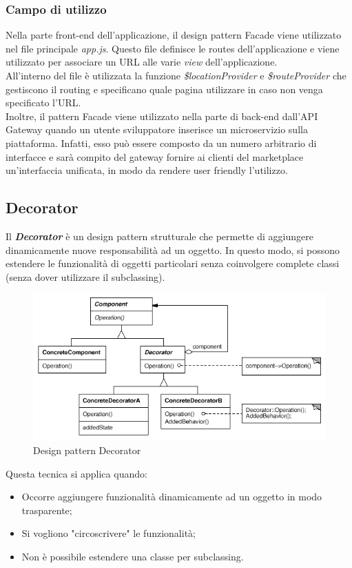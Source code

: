 \subsubsection{Campo di utilizzo}
Nella parte front-end dell'applicazione, il design pattern Facade viene utilizzato nel file principale \textit{app.js}. Questo file definisce le routes dell'applicazione e viene utilizzato per associare
un URL alle varie \textit{view} dell'applicazione.\\
All'interno del file è utilizzata la funzione  \textit{\$locationProvider} e \textit{\$routeProvider} che gestiscono il routing e specificano quale pagina utilizzare in caso non venga specificato l'URL.\\
Inoltre, il pattern Facade viene utilizzato nella parte di back-end dall'API Gateway quando un utente sviluppatore inserisce un microservizio sulla piattaforma. Infatti, esso può essere composto da un numero arbitrario di interfacce e sarà compito del gateway fornire ai clienti del marketplace un'interfaccia unificata, in modo da rendere user friendly l'utilizzo.


\subsection{Decorator}
Il \textbf{\textit{Decorator}} è un design pattern strutturale che permette di aggiungere dinamicamente nuove responsabilità ad un oggetto. In questo modo, si possono estendere le funzionalità di oggetti particolari senza coinvolgere
complete classi (senza dover utilizzare il subclassing).

\begin{figure}[H]
	\centering
	\includegraphics[width=0.7\linewidth]{IMG/decorator_pattern.png}
	\caption{Design pattern Decorator}
\end{figure}

Questa tecnica si applica quando:
\begin{itemize}
	\item Occorre aggiungere funzionalità dinamicamente ad un oggetto in modo	trasparente;
	
	\item Si vogliono "circoscrivere" le funzionalità;
	
	\item Non è possibile estendere una classe per subclassing.
\end{itemize}

